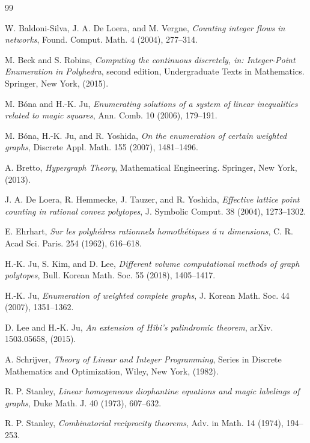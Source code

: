 \documentclass[reqno, 12pt]{amsart}
\theoremstyle{mydefinition}
\theoremstyle{myremark}
\begin{document}
\begin{thebibliography}{99}

 W. Baldoni-Silva, J. A. De Loera, and M. Vergne, \emph{Counting integer flows in networks}, Found. Comput. Math. 4 (2004), 277--314.

 M. Beck and S. Robins, \emph{Computing the continuous discretely, in: Integer-Point Enumeration in Polyhedra}, second edition, Undergraduate Texts in Mathematics. Springer, New York, (2015).


 M. B\'ona and H.-K. Ju, \emph{Enumerating solutions of a system of linear inequalities related to magic squares}, Ann. Comb. 10 (2006), 179--191.


 M. B\'ona, H.-K. Ju, and R. Yoshida, \emph{On the enumeration of certain weighted graphs}, Discrete Appl. Math. 155 (2007), 1481--1496.


 A. Bretto, \emph{Hypergraph Theory}, Mathematical Engineering. Springer, New York, (2013).

 J. A. De Loera, R. Hemmecke, J. Tauzer, and R. Yoshida, \emph{Effective lattice point counting in rational convex polytopes}, J. Symbolic Comput. 38 (2004), 1273--1302.


 E. Ehrhart, \emph{Sur les polyh\'edres rationnels homoth\'etiques \'a $n$ dimensions}, C. R. Acad Sci. Paris. 254 (1962), 616--618.


 H.-K. Ju, S. Kim, and D. Lee, \emph{Different volume computational methods of graph polytopes}, Bull. Korean Math. Soc. 55 (2018), 1405--1417.

 H.-K. Ju, \emph{Enumeration of weighted complete graphs}, J. Korean Math. Soc. 44 (2007), 1351--1362.


 D. Lee and H.-K. Ju, \emph{An extension of Hibi's palindromic theorem}, arXiv. 1503.05658, (2015).

 A. Schrijver, \emph{Theory of Linear and Integer Programming}, Series in Discrete Mathematics and Optimization, Wiley, New York, (1982).


 R. P. Stanley, \emph{Linear homogeneous diophantine equations and magic labelings of graphs}, Duke Math. J. 40 (1973), 607--632.


 R. P. Stanley, \emph{Combinatorial reciprocity theorems}, Adv. in Math. 14 (1974), 194--253.


\end{thebibliography}
\end{document}
